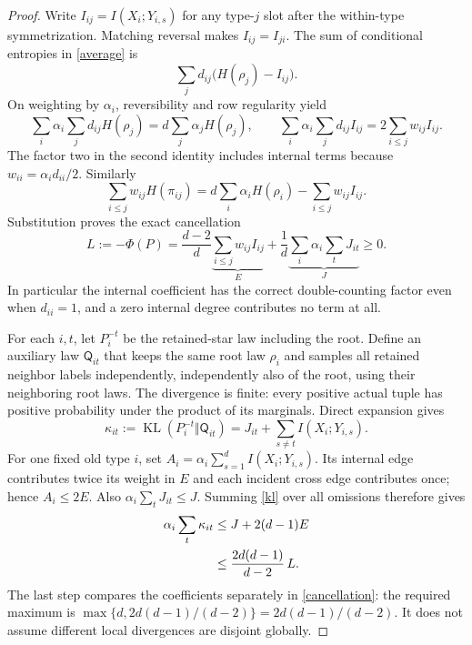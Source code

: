 \documentclass[11pt]{article}
\newcommand{\KL}{\operatorname{KL}}
\begin{document}
\begin{proof}
Write $I_{ij}=I(X_i;Y_{i,s})$ for any type-$j$ slot after the within-type
symmetrization. Matching reversal makes $I_{ij}=I_{ji}$. The sum of
conditional entropies in \eqref{average} is
\[
 \sum_jd_{ij}\bigl(H(\rho_j)-I_{ij}\bigr).
\]
On weighting by $\alpha_i$, reversibility and row regularity yield
\[
 \sum_i\alpha_i\sum_jd_{ij}H(\rho_j)
       =d\sum_j\alpha_jH(\rho_j),\qquad
 \sum_i\alpha_i\sum_jd_{ij}I_{ij}
       =2\sum_{i\leq j}w_{ij}I_{ij}.
\]
The factor two in the second identity includes internal terms because
$w_{ii}=\alpha_i d_{ii}/2$. Similarly
\[
 \sum_{i\leq j}w_{ij}H(\pi_{ij})
 =d\sum_i\alpha_iH(\rho_i)-\sum_{i\leq j}w_{ij}I_{ij}.
\]
Substitution proves the exact cancellation
\begin{equation}
 L:=-\Phi(P)=\frac{d-2}{d}\underbrace{\sum_{i\leq j}w_{ij}I_{ij}}_{E}
   +\frac1d\underbrace{\sum_i\alpha_i\sum_tJ_{it}}_{J}\geq0.
                                                        \label{cancellation}
\end{equation}
In particular the internal coefficient has the correct double-counting
factor even when $d_{ii}=1$, and a zero internal degree contributes no
term at all.

For each $i,t$, let $P_i^{-t}$ be the retained-star law including the
root. Define an auxiliary law $\mathsf Q_{it}$ that keeps the same root
law $\rho_i$ and samples all retained neighbor labels independently,
independently also of the root, using their neighboring root laws.
The divergence is finite: every positive actual tuple has positive
probability under the product of its marginals. Direct expansion gives
\begin{equation}
 \kappa_{it}:=\KL(P_i^{-t}\Vert\mathsf Q_{it})
   =J_{it}+\sum_{s\ne t}I(X_i;Y_{i,s}).              \label{kl}
\end{equation}
For one fixed old type $i$, set
$A_i=\alpha_i\sum_{s=1}^dI(X_i;Y_{i,s})$.
Its internal edge contributes twice its weight in $E$ and each incident
cross edge contributes once; hence $A_i\leq2E$. Also
$\alpha_i\sum_tJ_{it}\leq J$. Summing \eqref{kl} over all omissions
therefore gives
\begin{align}
 \alpha_i\sum_t\kappa_{it}
 &\leq J+2(d-1)E\notag\\
 &\leq \frac{2d(d-1)}{d-2}\,L.                    \label{sumkl}
\end{align}
The last step compares the coefficients separately in
\eqref{cancellation}: the required maximum is
$\max\{d,2d(d-1)/(d-2)\}=2d(d-1)/(d-2)$.
It does not assume different local divergences are disjoint globally.


\end{proof}
\end{document}

